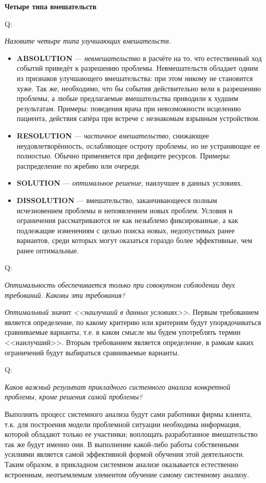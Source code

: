 \documentclass{article}
\newcommand{\note}[1]{\textit{#1}}
\newcommand{\important}[1]{\textbf{#1}}
\renewcommand{\subsection}[1]{
	\vspace{2em}
	\begin{flushright}
		\large
		\textbf{#1}
	\end{flushright}
	}
\newcommand{\question}[2]{
	\begin{flushright}
		Q:\hspace{2ex}\vline\hspace{2ex}
		\begin{minipage}{0.9\textwidth}
			\large
			\textit{#1}
		\end{minipage}
	\end{flushright}
	\begin{center}
		\begin{minipage}{0.95\textwidth}
			#2
		\end{minipage}
	\end{center}
	}
\begin{document}
\subsection{Четыре типа вмешательств}
\question{Назовите четыре типа улучшающих вмешательств.}{
\begin{itemize}
	\item \important{ABSOLUTION} --- \note{невмешательство} в расчёте на то, что естественный ход событий приведёт к разрешению проблемы. Невмешательств обладает одним из признаков улучшающего вмешательства: при этом никому не становится хуже. Так же, необходимо, что бы события действительно вели к разрешению проблемы, а любые предлагаемые вмешательства приводили к худшим результатам. Примеры: поведения врача при невозможности исцелению пациента, действия сапёра при встрече с незнакомым взрывным устройством.
	\item \important{RESOLUTION} --- \note{частичное вмешательство}, снижающее неудовлетворённость, ослабляющее остроту проблемы, но не устраняющее ее полностью. Обычно применяется при дефиците ресурсов. Примеры: распределение по жребию или очереди.
	\item \important{SOLUTION} --- \note{оптимальное решение}, наилучшее в данных условиях. 
	\item \important{DISSOLUTION} --- вмешательство, заканчивающееся полным исчезновением проблемы и непоявлением новых проблем. Условия и ограничения рассматриваются не как незыблемо фиксированные, а как подлежащие изменениям с целью поиска новых, недопустимых ранее вариантов, среди которых могут оказаться гораздо более эффективные, чем ранее оптимальные.
\end{itemize}}
\question{Оптимальность обеспечивается только при совокупном соблюдении двух требований. Каковы эти требования?}{\note{Оптимальный} значит \note{<<наилучший в данных условиях>>}. Первым требованием является определение, по какому критерию или критериям будут упорядочиваться сравниваемые варианты, т.е. в каком смысле мы будем употреблять термин <<наилучший>>. Вторым требованием является определение, в рамкам каких ограничений будут выбираться сравниваемые варианты.}
\question{Каков важный результат прикладного системного анализа конкретной проблемы, кроме решения самой проблемы?}{Выполнять процесс системного анализа будут сами работники фирмы клиента, т.к. для построения модели проблемной ситуации необходима информация, которой обладают только ее участники; воплощать разработанное вмешательство так же будут именно они. В выполнение какой-либо работы собственными усилиями является самой эффективной формой обучения этой деятельности. Таким образом, в прикладном системном анализе оказывается естественно встроенным, неотъемлемым элементом обучение самому системному анализу.}
\end{document}

